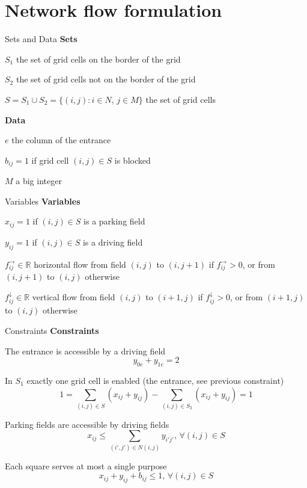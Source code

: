 \documentclass{beamer}
\begin{document}
\section{Network flow formulation}

\begin{frame}{Sets and Data}
\textbf{Sets}\medskip

$S_1$ the set of grid cells on the border of the grid\medskip

$S_2$ the set of grid cells not on the border of the grid\medskip

$S = S_1 \cup S_2 = \{(i,j): i \in N,\, j \in M\}$ the set of grid cells\medskip

\textbf{Data}\medskip

$e$ the column of the entrance\medskip

$b_{ij} = 1$ if grid cell $(i,j) \in S$ is blocked\medskip

$M$ a big integer

\end{frame}

\begin{frame}{Variables}
\textbf{Variables}\medskip

$x_{ij} = 1$ if $(i, j) \in S$ is a parking field\medskip

$y_{ij} = 1$ if $(i, j) \in S$ is a driving field\medskip

$f_{ij}^\rightarrow \in \mathbb{R}$ horizontal flow from field $(i,j)$ to $(i,j+1)$ if $f_{ij}^\rightarrow > 0$, or from $(i,j+1)$ to $(i, j)$ otherwise\medskip

$f_{ij}^\downarrow \in \mathbb{R}$ vertical flow from field $(i,j)$ to $(i+1 , j)$ if $f_{ij}^\downarrow > 0$, or from $(i+1 , j)$ to $(i, j)$ otherwise
    
\end{frame}

\begin{frame}{Constraints}
\textbf{Constraints}\medskip

The entrance is accessible by a driving field
$$y_{0e} + y_{1e} = 2$$

In $S_1$ exactly one grid cell is enabled (the entrance, see previous constraint)
$$1 = \sum_{(i,j) \in S} (x_{ij} + y_{ij}) - \sum_{(i,j) \in S_2} (x_{ij} + y_{ij}) = 1$$

Parking fields are accessible by driving fields
$$x_{ij} \leq \sum_{(i', j') \in N(i, j)} y_{i'j'}, \, \forall (i,j) \in S$$

Each square serves at most a single purpose
$$x_{ij} + y_{ij} + b_{ij} \leq 1, \, \forall (i,j) \in S$$
\end{frame}
\end{document}
